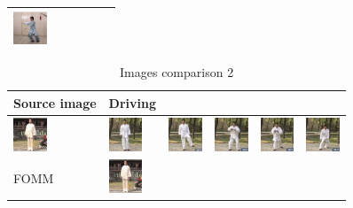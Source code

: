 \documentclass{article}
\begin{document}
\begin{table}[t]
\begin{center}
\begin{small}
\begin{sc}
\begin{tabular}{m{1.0cm}m{1.0cm}m{1.0cm}m{1.0cm}m{1.0cm}m{1.0cm}}
\includegraphics[width=1cm, height=1cm]{images/5_Ours_5} \\
\bottomrule
\end{tabular}
\end{sc}
\end{small}
\end{center}
\vskip -0.1in
\end{table}


\begin{table}[t]
\caption{Images comparison 2}
\label{table:images 2}
\vskip 0.15in
\begin{center}
\begin{small}
\begin{sc}
\begin{tabular}{m{1.0cm}m{1.0cm}m{1.0cm}m{1.0cm}m{1.0cm}m{1.0cm}}
\toprule
Source image & Driving\\
\toprule
\includegraphics[width=1cm, height=1cm]{images/intro_image/source.png} &
\includegraphics[width=1cm, height=1cm]{images/intro_image/Driving_1.png} &
\includegraphics[width=1cm, height=1cm]{images/intro_image/Driving_2.png} &
\includegraphics[width=1cm, height=1cm]{images/intro_image/Driving_4.png} &
\includegraphics[width=1cm, height=1cm]{images/intro_image/Driving_5.png} &
\includegraphics[width=1cm, height=1cm]{images/intro_image/Driving_6.png} \\
\midrule
FOMM & \includegraphics[width=1cm, height=1cm]{images/intro_image/animate_1_fomm.png} &

\end{tabular}
\end{sc}
\end{small}
\end{center}
\end{table}
\end{document}
